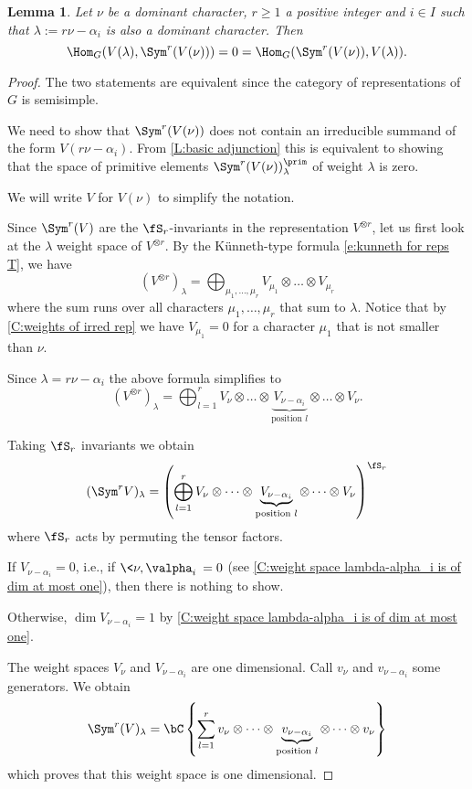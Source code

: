\documentclass[reqno, 10pt]{amsart}
\theoremstyle{plain}
\newtheorem{lemma}[proposition]{Lemma}
\theoremstyle{definition}
\numberwithin{equation}{section}%
\begin{document}
\begin{lemma}\label{L:no map Vlambda to Symr}
	Let $\nu$ be a dominant character, $r\ge 1$  a positive integer and $i\in I$ such that $\lambda:= r\nu-\alpha_i$ is also a dominant character.
	Then 
	\[ \Hom_{G}(V(\lambda),\Sym^r(V(\nu))) = 0 = \Hom_G(\Sym^r(V(\nu)),V(\lambda)).\]
\end{lemma}
\begin{proof}
	The two statements are equivalent since the category of representations of $G$ is semisimple.
	
	We need to show that $\Sym^r(V(\nu))$ does not contain an irreducible summand of the form $V(r\nu-\alpha_i)$.
	From \cref{L:basic adjunction} this is equivalent to showing that the space of primitive elements $\Sym^r(V(\nu))^\prim_\lambda$ of weight $\lambda$ is zero.
	
	We will write $V$ for $V(\nu)$ to simplify the notation.
	
	Since $\Sym^r(V)$ are the $\fS_r$-invariants in the representation $V^{\otimes r}$, let us first look at the $\lambda$ weight space of $V^{\otimes r}$.
	By the Künneth-type formula \eqref{e:kunneth for reps T}, we have 
	\begin{equation}\label{eq:weight_space_tensor_prod}
	(V^{\otimes r})_{\lambda} = \bigoplus_{\mu_1,\dots,\mu_r} V_{\mu_1}\otimes\dots\otimes V_{\mu_r} 
	\end{equation} 
	where the sum runs over all characters $\mu_1,\dots,\mu_r$ that sum to $\lambda$.
	Notice that by \cref{C:weights of irred rep} we have $V_{\mu_1}=0$ for a character $\mu_1$ that is not smaller than $\nu$.
	
	Since $\lambda = r\nu-\alpha_i$ the above formula simplifies to
	\[ (V^{\otimes r})_{\lambda} = \bigoplus_{l=1}^rV_\nu\otimes\dots\otimes 
	\underbrace{V_{\nu-\alpha_i}}_{\text{position }l}\otimes\dots\otimes V_\nu.\]
	
	Taking $\fS_r$ invariants we obtain
	\[ (\Sym^rV)_\lambda = \left(\bigoplus_{l=1}^rV_\nu\otimes\dots\otimes 
	\underbrace{V_{\nu-\alpha_i}}_{\text{position }l}\otimes\dots\otimes V_\nu\right)^{\fS_r} \]
	where $\fS_r$ acts by permuting the tensor factors.
	
	If $V_{\nu-\alpha_i}=0$, i.e., if $\<\nu,\valpha_i\> = 0$ (see \cref{C:weight space lambda-alpha_i is of dim at most one}), then there is nothing to show.
	
	Otherwise, $\dim V_{\nu-\alpha_i}=1$ by \cref{C:weight space lambda-alpha_i is of dim at most one}. 

		The weight spaces $V_\nu$ and $V_{\nu-\alpha_i}$ are one dimensional. Call $v_\nu$ and $v_{\nu-\alpha_i}$ some generators. 
		We obtain
	\[ \Sym^r(V)_\lambda = \bC \left\{\sum_{l=1}^r v_\nu\otimes\dots\otimes\underbrace{v_{\nu-\alpha_i}}_{\text{position }l}\otimes\dots\otimes v_\nu\right\}\]
	which proves that this weight space is one dimensional.


\end{proof}
\end{document}
